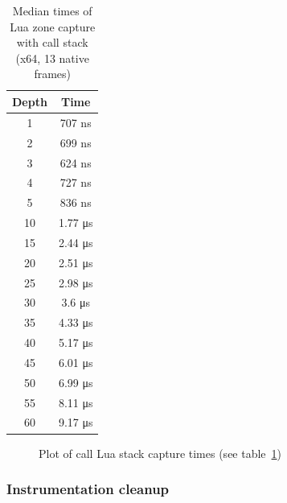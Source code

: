 \documentclass[hidelinks,titlepage,a4paper,twoside]{article}
\begin{document}
\begin{table}[h]
\centering
\begin{tabular}[h]{c|c}
\textbf{Depth} & \textbf{Time} \\ \hline
1 & 707 \si{\nano\second} \\
2 & 699 \si{\nano\second} \\
3 & 624 \si{\nano\second} \\
4 & 727 \si{\nano\second} \\
5 & 836 \si{\nano\second} \\
10 & 1.77 \si{\micro\second} \\
15 & 2.44 \si{\micro\second} \\
20 & 2.51 \si{\micro\second} \\
25 & 2.98 \si{\micro\second} \\
30 & 3.6 \si{\micro\second} \\
35 & 4.33 \si{\micro\second} \\
40 & 5.17 \si{\micro\second} \\
45 & 6.01 \si{\micro\second} \\
50 & 6.99 \si{\micro\second} \\
55 & 8.11 \si{\micro\second} \\
60 & 9.17 \si{\micro\second}
\end{tabular}
\caption{Median times of Lua zone capture with call stack (x64, 13 native frames)}
\label{CallstackTimesLua}
\end{table}

\begin{figure}[h]
\centering{}
\caption{Plot of call Lua stack capture times (see table~\ref{CallstackTimesLua})}
\label{CallstackPlotLua}
\end{figure}

\subsubsection{Instrumentation cleanup}
\end{document}
